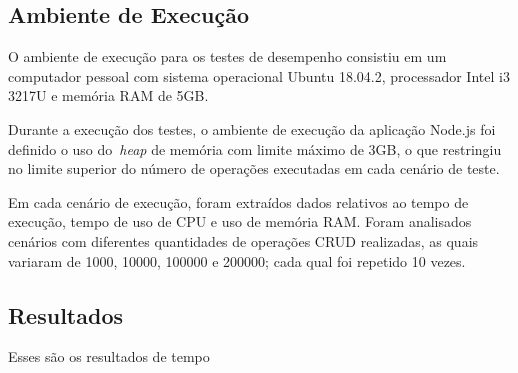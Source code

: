 \documentclass[12pt]{article}
\begin{document}
\subsection{Ambiente de Execução}

O ambiente de execução para os testes de desempenho consistiu em um computador pessoal com sistema operacional Ubuntu 18.04.2, processador Intel i3 3217U e memória RAM de 5GB. 

Durante a execução dos testes, o ambiente de execução da aplicação Node.js foi definido o uso do~\emph{heap} de memória com limite máximo de 3GB, o que restringiu no limite superior do número de operações executadas em cada cenário de teste.

Em cada cenário de execução, foram extraídos dados relativos ao tempo de execução, tempo de uso de CPU e uso de memória RAM.
Foram analisados cenários com diferentes quantidades de operações CRUD realizadas, as quais variaram de 1000, 10000, 100000 e 200000; cada qual foi repetido 10 vezes. 

\subsection{Resultados}
\label{section:resultados}


Esses são os resultados de tempo
\end{document}
